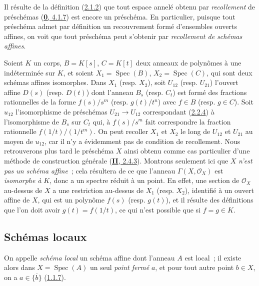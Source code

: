 \begin{env}[2.3.1]
\label{I.2.3.1-fr}
Il résulte de la définition (\hyperref[I.2.1.2-fr]{2.1.2}) que tout espace
annelé obtenu par \emph{recollement} de préschémas
(\hyperref[0.4.1.7-fr]{\textbf{0}, 4.1.7}) est encore un préschéma. En particulier,
puisque tout préschéma admet par définition un recouvrement formé d'ensembles
ouverts affines, on voit que tout préschéma peut s'obtenir par
\emph{recollement de schémas affines}.
\end{env}

\begin{example}[2.3.2]
\label{I.2.3.2-fr}
Soient $K$ un corps, $B=K[s]$, $C=K[t]$ deux anneaux de polynômes à une
indéterminée sur $K$, et soient $X_1=\operatorname{Spec}(B)$,
$X_2=\operatorname{Spec}(C)$, qui sont deux schémas affines isomorphes. Dans
$X_1$ (resp. $X_2$), soit $U_{12}$ (resp. $U_{21}$) l'ouvert affine $D(s)$
(resp. $D(t)$) dont l'anneau $B_s$ (resp. $C_t$) est formé des fractions
rationnelles de la forme $f(s)/s^m$ (resp. $g(t)/t^n$) avec $f\in B$
(resp. $g\in C$). Soit $u_{12}$ l'isomorphisme de préschémas
$U_{21}\to U_{12}$ correspondant (\hyperref[I.2.2.4-fr]{2.2.4}) à
l'isomorphisme de $B_s$ sur $C_t$ qui, à $f(s)/s^m$ fait correspondre la
fraction rationnelle $f(1/t)/(1/t^m)$. On peut recoller $X_1$ et $X_2$ le long
de $U_{12}$ et $U_{21}$ au moyen de $u_{12}$, car il n'y a évidemment pas de
condition de recollement. Nous retrouverons plus tard le préschéma $X$ ainsi
obtenu comme cas particulier d'une méthode de construction générale
(\hyperref[II.2.4.3-fr]{\textbf{II}, 2.4.3}). Montrons seulement ici que $X$ \emph{n'est
pas un schéma affine}~; cela résultera de ce que l'anneau
$\Gamma(X,\mathscr{O}_X)$ est \emph{isomorphe à} $K$, donc a un spectre réduit
à un point. En effet, une section de $\mathscr{O}_X$ au-dessus de $X$ a une
restriction au-dessus de $X_1$ (resp. $X_2$), identifié à un ouvert affine de
$X$, qui est un polynôme $f(s)$ (resp. $g(t)$), et il résulte des définitions
que l'on doit avoir $g(t)=f(1/t)$, ce qui n'est possible que si $f=g\in K$.
\end{example}

\subsection{Schémas locaux}
\label{subsection:I.2.4-fr}

\begin{env}[2.4.1]
\label{I.2.4.1-fr}
On appelle \emph{schéma local} un schéma affine dont l'anneau $A$ est local~;
il existe alors dans $X=\operatorname{Spec}(A)$ un seul \emph{point fermé}
$a$, et pour tout autre point $b\in X$, on a
$a\in\overline{\{b\}}$ (\hyperref[I.1.1.7-fr]{1.1.7}).
\end{env}

